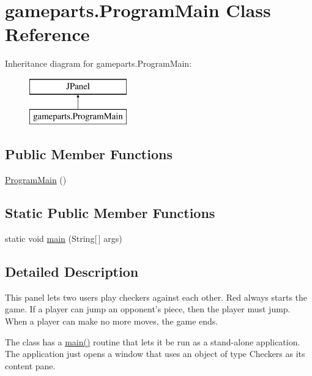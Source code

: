 \hypertarget{classgameparts_1_1_program_main}{\section{gameparts.\-Program\-Main Class Reference}
\label{classgameparts_1_1_program_main}
}
Inheritance diagram for gameparts.\-Program\-Main\-:\begin{figure}[H]
\begin{center}
\leavevmode
\includegraphics[height=2.000000cm]{classgameparts_1_1_program_main}
\end{center}
\end{figure}
\subsection*{Public Member Functions}
\begin{DoxyCompactItemize}
\item 
\hyperlink{classgameparts_1_1_program_main_a3b8bca5c6420701c597def2221ebd7da}{Program\-Main} ()
\end{DoxyCompactItemize}
\subsection*{Static Public Member Functions}
\begin{DoxyCompactItemize}
\item 
static void \hyperlink{classgameparts_1_1_program_main_a74297340a51bb5dcb09d3a1c9b603d63}{main} (String\mbox{[}$\,$\mbox{]} args)
\end{DoxyCompactItemize}


\subsection{Detailed Description}
This panel lets two users play checkers against each other. Red always starts the game. If a player can jump an opponent's piece, then the player must jump. When a player can make no more moves, the game ends.

The class has a \hyperlink{classgameparts_1_1_program_main_a74297340a51bb5dcb09d3a1c9b603d63}{main()} routine that lets it be run as a stand-\/alone application. The application just opens a window that uses an object of type Checkers as its content pane.

